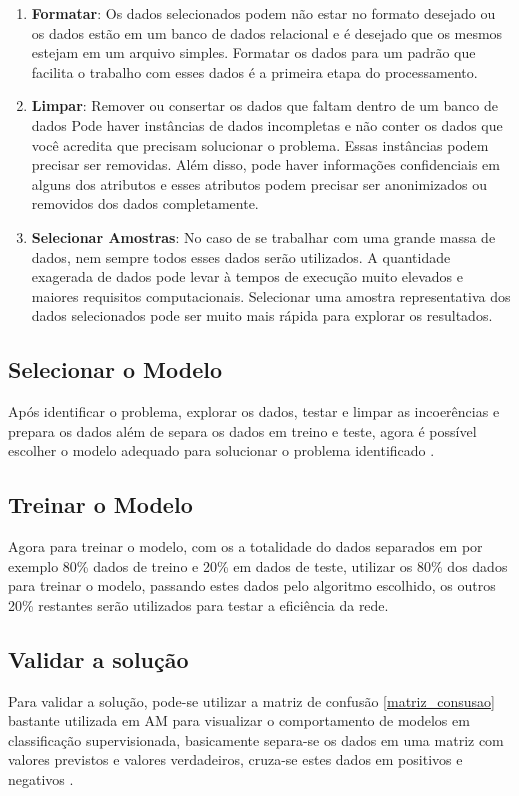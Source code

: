 \begin{enumerate}
    \item \textbf{Formatar}: Os dados selecionados podem não estar no formato desejado ou os dados estão em um banco de dados relacional e é desejado que os mesmos estejam em um arquivo simples. Formatar os dados para um padrão que facilita o trabalho com esses dados é a primeira etapa do processamento.
    \item \textbf{Limpar}: Remover ou consertar os dados que faltam dentro de um banco de dados  Pode haver instâncias de dados incompletas e não conter os dados que você acredita que precisam solucionar o problema. Essas instâncias podem precisar ser removidas. Além disso, pode haver informações confidenciais em alguns dos atributos e esses atributos podem precisar ser anonimizados ou removidos dos dados completamente.
    \item \textbf{Selecionar Amostras}: No caso de se trabalhar com uma grande massa de dados, nem sempre todos esses dados serão utilizados. A quantidade exagerada de dados pode levar à tempos de execução muito elevados e maiores requisitos computacionais. Selecionar uma amostra representativa dos dados selecionados pode ser muito mais rápida para explorar os resultados.
\end{enumerate}

\subsection{Selecionar o Modelo}
Após identificar o problema, explorar os dados, testar e limpar as incoerências e prepara os dados além de separa os dados em treino e teste, agora é possível escolher o modelo adequado para solucionar o problema identificado \cite{geron2017hands}.

\subsection{Treinar o Modelo}
Agora para treinar o modelo, com os a totalidade do dados separados em por exemplo 80\% dados de treino e 20\% em dados de teste, utilizar os 80\% dos dados para treinar o modelo, passando estes dados pelo algoritmo escolhido, os outros 20\% restantes serão utilizados para testar a eficiência da rede. 

\subsection{Validar a solução}
Para validar a solução, pode-se utilizar a matriz de confusão \ref{matriz_consusao} bastante utilizada em AM para visualizar o comportamento de modelos em classificação supervisionada, basicamente separa-se os dados em uma matriz com valores previstos e valores verdadeiros, cruza-se estes dados em positivos e negativos \cite{caelen2017bayesian}.

